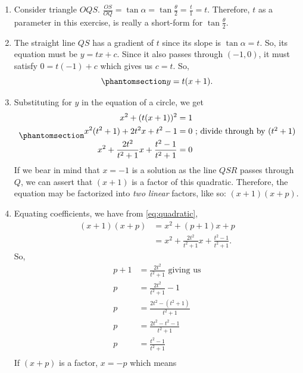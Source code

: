 \documentclass[
  a4paper,
]{article}
\begin{document}
\begin{enumerate}
\item
  Consider triangle \(OQS\).
  \(\frac{OS}{OQ} = \tan\alpha = \tan\frac{\theta}{2} = \frac{t}{1} = t\).
  Therefore, \(t\) as a parameter in this exercise, is really a
  short-form for \(\tan\frac{\theta}{2}\).
\item
  The straight line \(QS\) has a gradient of \(t\) since its slope is
  \(\tan\alpha = t\). So, its equation must be \(y = tx + c\). Since it
  also passes through \((-1, 0)\), it must satisfy \(0 = t(-1) + c\)
  which gives us \(c = t\). So,
  \begin{equation}\phantomsection\label{eq:stline}{
  y = t(x + 1).
  }\end{equation}
\item
  Substituting for \(y\) in the equation of a circle, we get
  \begin{equation}\phantomsection\label{eq:quadratic}{
  \begin{aligned}
  x^2 +(t(x + 1))^2 &= 1\\
  x^2(t^2 + 1) + 2t^2x + t^2 - 1 &= 0 \mbox{ ; divide through by $(t^2 + 1)$}\\
  x^2 + \frac{2t^2}{t^2 + 1}x + \frac{t^2 - 1}{t^2 +1} &= 0
  \end{aligned}
  }\end{equation} If we bear in mind that \(x = -1\) is a solution as
  the line \(QSR\) passes through \(Q\), we can assert that \((x + 1)\)
  is a factor of this quadratic. Therefore, the equation may be
  factorized into \emph{two linear} factors, like so:
  \((x + 1)(x + p)\).
\item
  Equating coefficients, we have from \cref{eq:quadratic}, \[
  \begin{aligned}
  (x + 1)(x + p) &= x^2 + (p + 1)x + p \\
  &= x^2 + \frac{2t^2}{t^2 + 1}x + \frac{t^2 - 1}{t^2 +1}.
  \end{aligned}
  \] So, \[
  \begin{aligned}
  p + 1 &= \frac{2t^2}{t^2 + 1} \mbox{ giving us}\\
  p &= \frac{2t^2}{t^2 + 1} - 1\\
  p &= \frac{2t^2 - (t^2 + 1)}{t^2 + 1}\\
  p &= \frac{2t^2 - t^2 - 1}{t^2 + 1}\\
  p &= \frac{t^2 - 1}{t^2 + 1}\\
  \end{aligned}
  \] If \((x + p)\) is a factor, \(x = -p\) which means

\end{enumerate}
\end{document}
